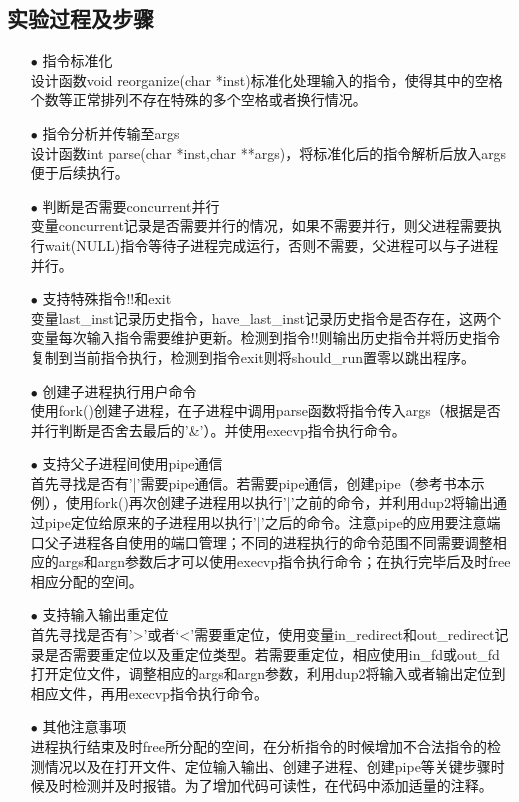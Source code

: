 \documentclass{article}
\begin{document}
\subsection{实验过程及步骤}
\begin{itemize}
\item[$\bullet$]指令标准化\\
设计函数void reorganize(char *inst)标准化处理输入的指令，使得其中的空格个数等正常排列不存在特殊的多个空格或者换行情况。
\item[$\bullet$]指令分析并传输至args\\
设计函数int parse(char *inst,char **args)，将标准化后的指令解析后放入args便于后续执行。
\item[$\bullet$]判断是否需要concurrent并行\\
变量concurrent记录是否需要并行的情况，如果不需要并行，则父进程需要执行wait(NULL)指令等待子进程完成运行，否则不需要，父进程可以与子进程并行。
\item[$\bullet$]支持特殊指令!!和exit\\
变量last\_inst记录历史指令，have\_last\_inst记录历史指令是否存在，这两个变量每次输入指令需要维护更新。检测到指令!!则输出历史指令并将历史指令复制到当前指令执行，检测到指令exit则将should\_run置零以跳出程序。
\item[$\bullet$]创建子进程执行用户命令\\
使用fork()创建子进程，在子进程中调用parse函数将指令传入args（根据是否并行判断是否舍去最后的'\&'）。并使用execvp指令执行命令。
\item[$\bullet$]支持父子进程间使用pipe通信\\
首先寻找是否有'|'需要pipe通信。若需要pipe通信，创建pipe（参考书本示例），使用fork()再次创建子进程用以执行'|'之前的命令，并利用dup2将输出通过pipe定位给原来的子进程用以执行'|'之后的命令。注意pipe的应用要注意端口父子进程各自使用的端口管理；不同的进程执行的命令范围不同需要调整相应的args和argn参数后才可以使用execvp指令执行命令；在执行完毕后及时free相应分配的空间。
\item[$\bullet$]支持输入输出重定位\\
首先寻找是否有'>'或者‘<’需要重定位，使用变量in\_redirect和out\_redirect记录是否需要重定位以及重定位类型。若需要重定位，相应使用in\_fd或out\_fd打开定位文件，调整相应的args和argn参数，利用dup2将输入或者输出定位到相应文件，再用execvp指令执行命令。
\item[$\bullet$]其他注意事项\\
进程执行结束及时free所分配的空间，在分析指令的时候增加不合法指令的检测情况以及在打开文件、定位输入输出、创建子进程、创建pipe等关键步骤时候及时检测并及时报错。为了增加代码可读性，在代码中添加适量的注释。
\end{itemize}
\end{document}
